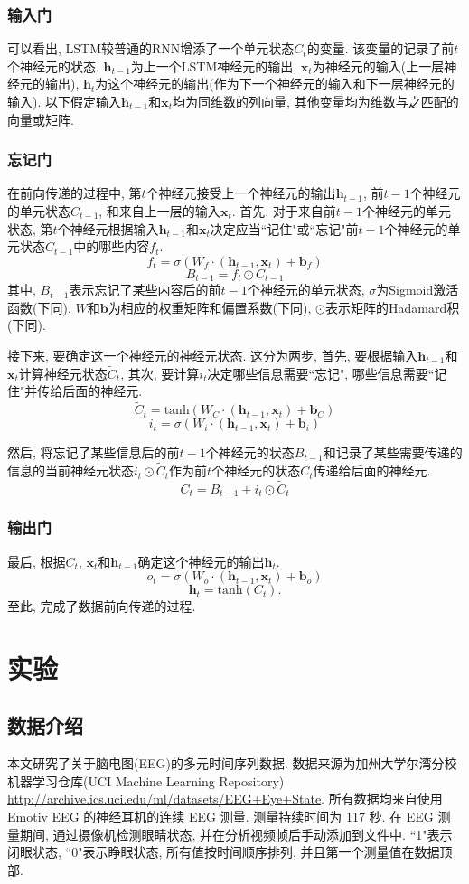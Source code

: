 \documentclass[12pt]{ctexart}
\begin{document}
\subsubsection{输入门}
可以看出, LSTM较普通的RNN增添了一个单元状态$C_{t}$的变量. 该变量的记录了前$t$个神经元的状态. $\bm{h}_{t-1}$为上一个LSTM神经元的输出, $\bm{x}_{t}$为神经元的输入(上一层神经元的输出), $\bm{h}_{t}$为这个神经元的输出(作为下一个神经元的输入和下一层神经元的输入). 以下假定输入$\bm{h}_{t-1}$和$\bm{x}_{t}$均为同维数的列向量, 其他变量均为维数与之匹配的向量或矩阵.
\subsubsection{忘记门}
在前向传递的过程中, 第$t$个神经元接受上一个神经元的输出$\bm{h}_{t-1}$, 前$t-1$个神经元的单元状态$C_{t-1}$, 和来自上一层的输入$\bm{x}_{t}$. 首先, 对于来自前$t-1$个神经元的单元状态, 第$t$个神经元根据输入$\bm{h}_{t-1}$和$\bm{x}_{t}$决定应当``记住"或``忘记"前$t-1$个神经元的单元状态$C_{t-1}$中的哪些内容$f_{t}$.
$$f_{t}=\sigma (W_{f}\cdot (\bm{h}_{t-1},\bm{x}_{t})+\bm{b}_{f})$$ 
$$B_{t-1}=f_{t}\odot C_{t-1}$$
其中, $B_{t-1}$表示忘记了某些内容后的前$t-1$个神经元的单元状态, $\sigma$为Sigmoid激活函数(下同), $W$和$\bm{b}$为相应的权重矩阵和偏置系数(下同), $\odot$表示矩阵的Hadamard积(下同).

接下来, 要确定这一个神经元的神经元状态. 这分为两步, 首先, 要根据输入$\bm{h}_{t-1}$和$\bm{x}_{t}$计算神经元状态$\tilde{C}_{t}$, 其次, 要计算$i_{t}$决定哪些信息需要``忘记", 哪些信息需要``记住"并传给后面的神经元.
$$\tilde{C}_{t}=\mathrm{tanh}(W_{C}\cdot (\bm{h}_{t-1},\bm{x}_{t})+\bm{b}_{C})$$
$$i_{t}=\sigma(W_{i}\cdot (\bm{h}_{t-1},\bm{x}_{t})+\bm{b}_{i})$$

然后, 将忘记了某些信息后的前$t-1$个神经元的状态$B_{t-1}$和记录了某些需要传递的信息的当前神经元状态$i_{t}\odot \tilde{C}_{t}$作为前$t$个神经元的状态$C_{t}$传递给后面的神经元.
$$C_{t}=B_{t-1}+i_{t}\odot \tilde{C}_{t}$$
\subsubsection{输出门}
最后, 根据$C_{t}$, $\bm{x}_{t}$和$\bm{h}_{t-1}$确定这个神经元的输出$\bm{h}_{t}$.
$$o_{t}=\sigma(W_{o}\cdot (\bm{h}_{t-1},\bm{x}_{t})+\bm{b}_{o})$$
$$\bm{h}_{t}=\mathrm{tanh}(C_{t}).$$
至此, 完成了数据前向传递的过程.


\section{实验}
\subsection{数据介绍}
本文研究了关于脑电图(EEG)的多元时间序列数据. 数据来源为加州大学尔湾分校机器学习仓库(UCI Machine Learning Repository) \url{http://archive.ics.uci.edu/ml/datasets/EEG+Eye+State}. 所有数据均来自使用 Emotiv EEG 的神经耳机的连续 EEG 测量. 测量持续时间为 117 秒. 在 EEG 测量期间, 通过摄像机检测眼睛状态, 并在分析视频帧后手动添加到文件中. ``1"表示闭眼状态, ``0"表示睁眼状态, 所有值按时间顺序排列, 并且第一个测量值在数据顶部. 
\end{document}
